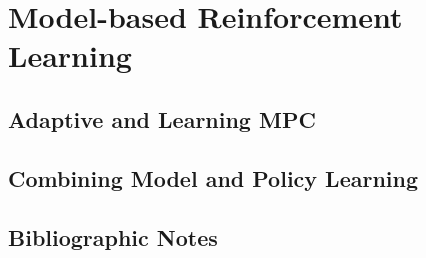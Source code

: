 \chapter{Model-based Reinforcement Learning}

\section{Adaptive and Learning MPC}











\section{Combining Model and Policy Learning}




\section{Bibliographic Notes}

